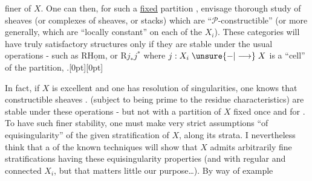 %
finer of $X$. One can then, for such a \uline{fixed} partition , envisage  thorough study  of sheaves (or complexes of sheaves, or stacks) which are ``$\mathcal P$-constructible'' (or more generally, which are ``locally constant'' on each of the $X_i$). These categories will have truly  satisfactory structures only if they are stable under the usual operations - such as $\mathrm R\underline{\mathrm{Hom}}$, or $\mathrm Rj_*j^*$ where $j:X_i\mathrel{\unsure{-|\longrightarrow}}X$ is a ``cell'' of the partition, .\raisebox{0.35ex}[0pt][0pt]{\parbox[c][0pt][c]{0pt}{}} In fact, if $X$ is excellent and one has resolution of singularities, one knows that constructible  sheaves . (subject to being prime to the residue characteristics) are stable under  these operations - but not with a partition of $X$ fixed once and for . To have such finer stability, one must make very strict assumptions  ``of equisingularity'' of the given stratification of $X$, along its strata. I nevertheless think that a  of the known techniques will show that $X$ admits arbitrarily fine stratifications having these equisingularity properties (and with regular and connected $X_i$, but that matters little  our  purpose\ldots). By way of example
